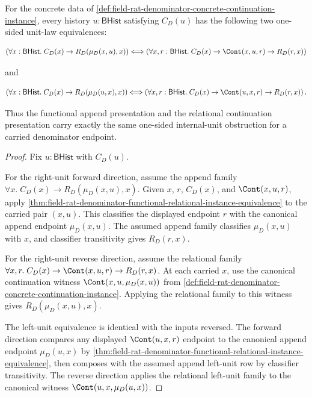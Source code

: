 \begin{theorem}
\label{thm:field-rat-denominator-append-relational-unit-law-equivalence}
For the concrete data of
\autoref{def:field-rat-denominator-concrete-continuation-instance}, every
history $u:\mathsf{BHist}$ satisfying $C_D(u)$ has the following two one-sided
unit-law equivalences:

$$
\left(\forall x:\mathsf{BHist}.\;
C_D(x)\to R_D(\mu_D(x,u),x)\right)
\Longleftrightarrow
\left(\forall x,r:\mathsf{BHist}.\;
C_D(x)\to \Cont(x,u,r)\to R_D(r,x)\right)
$$

and

$$
\left(\forall x:\mathsf{BHist}.\;
C_D(x)\to R_D(\mu_D(u,x),x)\right)
\Longleftrightarrow
\left(\forall x,r:\mathsf{BHist}.\;
C_D(x)\to \Cont(u,x,r)\to R_D(r,x)\right).
$$

Thus the functional append presentation and the relational continuation
presentation carry exactly the same one-sided internal-unit obstruction for a
carried denominator endpoint.
\end{theorem}
\begin{proof}
Fix $u:\mathsf{BHist}$ with $C_D(u)$.

For the right-unit forward direction, assume the append family
$\forall x.\;C_D(x)\to R_D(\mu_D(x,u),x)$. Given $x$, $r$, $C_D(x)$, and
$\Cont(x,u,r)$, apply
\autoref{thm:field-rat-denominator-functional-relational-instance-equivalence}
to the carried pair $(x,u)$. This classifies the displayed endpoint $r$ with
the canonical append endpoint $\mu_D(x,u)$. The assumed append family
classifies $\mu_D(x,u)$ with $x$, and classifier transitivity gives $R_D(r,x)$.

For the right-unit reverse direction, assume the relational family
$\forall x,r.\;C_D(x)\to\Cont(x,u,r)\to R_D(r,x)$. At each carried $x$, use the
canonical continuation witness $\Cont(x,u,\mu_D(x,u))$ from
\autoref{def:field-rat-denominator-concrete-continuation-instance}. Applying
the relational family to this witness gives $R_D(\mu_D(x,u),x)$.

The left-unit equivalence is identical with the inputs reversed. The forward
direction compares any displayed $\Cont(u,x,r)$ endpoint to the canonical
append endpoint $\mu_D(u,x)$ by
\autoref{thm:field-rat-denominator-functional-relational-instance-equivalence},
then composes with the assumed append left-unit row by classifier transitivity.
The reverse direction applies the relational left-unit family to the canonical
witness $\Cont(u,x,\mu_D(u,x))$.
\end{proof}

